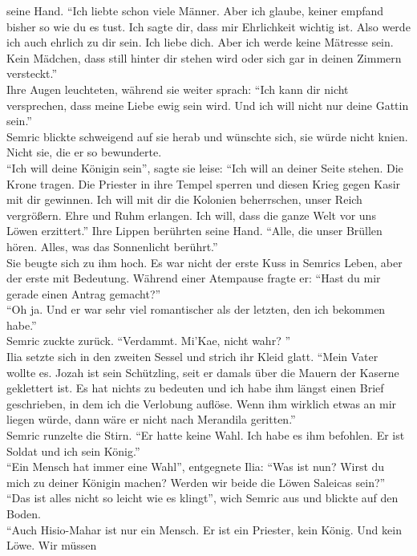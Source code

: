 seine Hand. ``Ich liebte schon viele Männer. Aber ich glaube, keiner empfand bisher so 
wie du es tust. Ich sagte dir, dass mir Ehrlichkeit wichtig ist. Also werde ich auch ehrlich zu dir 
sein. Ich liebe dich. Aber ich werde keine Mätresse sein. Kein Mädchen, dass still hinter dir 
stehen wird oder sich gar in deinen Zimmern versteckt.''\\
Ihre Augen leuchteten, während sie weiter sprach: ``Ich kann dir nicht versprechen, dass meine 
Liebe ewig sein wird. Und ich will nicht nur deine Gattin sein.''\\
Semric blickte schweigend auf sie herab und wünschte sich, sie würde nicht knien. Nicht sie, die er 
so bewunderte.\\
``Ich will deine Königin sein'', sagte sie leise: ``Ich will an deiner Seite stehen. Die Krone 
tragen. Die Priester in ihre Tempel sperren und diesen Krieg gegen Kasir mit dir gewinnen. Ich will 
mit dir die Kolonien beherrschen, unser Reich vergrößern. Ehre und Ruhm erlangen. Ich will, dass die 
ganze Welt vor uns Löwen erzittert.'' Ihre Lippen berührten seine Hand. ``Alle, die unser Brüllen 
hören. Alles, was das Sonnenlicht berührt.''\\
Sie beugte sich zu ihm hoch. Es war nicht der erste Kuss in Semrics Leben, aber der erste mit 
Bedeutung. Während einer Atempause fragte er: ``Hast du mir gerade einen Antrag gemacht?''\\
``Oh ja. Und er war sehr viel romantischer als der letzten, den ich bekommen habe.''\\
Semric zuckte zurück. ``Verdammt. Mi'Kae, nicht wahr? ''\\
Ilia setzte sich in den zweiten Sessel und strich ihr Kleid glatt. ``Mein Vater wollte es. Jozah 
ist sein Schützling, seit er damals über die Mauern der Kaserne geklettert ist. Es hat nichts zu 
bedeuten und ich habe ihm längst einen Brief geschrieben, in dem ich die Verlobung auflöse. Wenn 
ihm wirklich etwas an mir liegen würde, dann wäre er nicht nach Merandila geritten.''\\
Semric runzelte die Stirn. ``Er hatte keine Wahl. Ich habe es ihm befohlen. Er ist Soldat und 
ich sein König.''\\
``Ein Mensch hat immer eine Wahl'', entgegnete Ilia: ``Was ist nun? Wirst du mich zu deiner Königin 
machen? Werden wir beide die Löwen Saleicas sein?''\\
``Das ist alles nicht so leicht wie es klingt'', wich Semric aus und blickte auf den Boden.\\
``Auch Hisio-Mahar ist nur ein Mensch. Er ist ein Priester, kein König. Und kein Löwe. Wir müssen 
